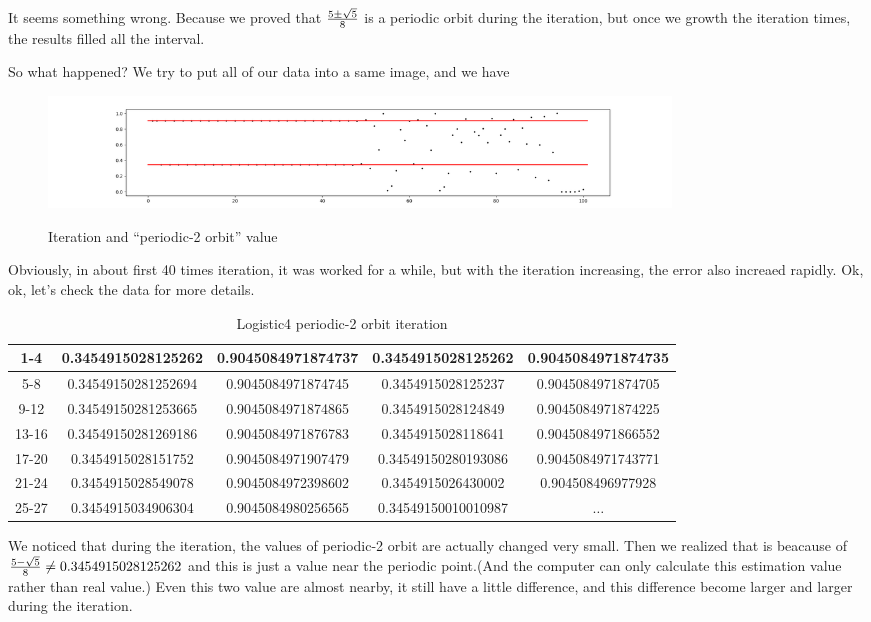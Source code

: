 \documentclass[12pt]{article}
\theoremstyle{plain}
\begin{document}
It seems something wrong. Because we proved that ${5 \pm \sqrt{5}\over 8}$ is a periodic orbit during the iteration, but once we growth the iteration times, the results filled all the interval.

So what happened? We try to put all of our data into a same image, and we have
\begin{figure}[H]
\begin{center}
\includegraphics[width=0.8\textwidth]{figure/section1/4-logistic-stable-check.png} \\
\caption{Iteration and ``periodic-2 orbit'' value}\label{periodic-2-check}
\end{center}
\end{figure}

Obviously, in about first 40 times iteration, it was worked for a while, but with the iteration increasing, the error also increaed rapidly. Ok, ok, let's check the data for more details.
\begin{table}[H]
\centering  
\caption{Logistic4 periodic-2 orbit iteration}  
\begin{tabular}{|c||c|c|c|c|}
\hline
1-4   & 0.3454915028125262  & 0.9045084971874737  & 0.3454915028125262  & 0.9045084971874735 \\
\hline
5-8   & 0.34549150281252694 & 0.9045084971874745  & 0.3454915028125237  & 0.9045084971874705 \\
\hline
9-12  & 0.34549150281253665 & 0.9045084971874865  & 0.3454915028124849  & 0.9045084971874225 \\
\hline
13-16 & 0.34549150281269186 & 0.9045084971876783  & 0.3454915028118641  & 0.9045084971866552 \\
\hline
17-20 & 0.3454915028151752  & 0.9045084971907479  & 0.34549150280193086 & 0.9045084971743771 \\
\hline
21-24 & 0.3454915028549078  & 0.9045084972398602  & 0.3454915026430002  & 0.904508496977928  \\
\hline
25-27 & 0.3454915034906304  & 0.9045084980256565  & 0.34549150010010987 & $\ldots$           \\
\hline
\end{tabular}  
\end{table}

We noticed that during the iteration, the values of periodic-2 orbit are actually changed very small. Then we realized that is beacause of ${5 - \sqrt{5}\over 8} \neq 0.3454915028125262$ and this is just a value near the periodic point.(And the computer can only calculate this estimation value rather than real value.) Even this two value are almost nearby, it still have a little difference, and this difference become larger and larger during the iteration.
\end{document}
